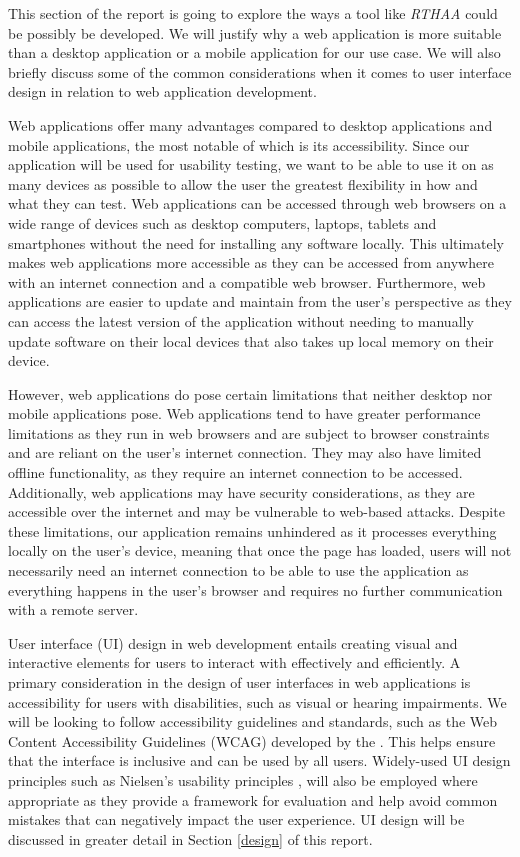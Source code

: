 \documentclass[12pt, a4paper]{article}
\newcommand{\np}
    {
    \vskip 0.4cm
    }
\begin{document}
This section of the report is going to explore the ways a tool like \textit{RTHAA} could be possibly be developed. We will justify why a web application is more suitable than a desktop application or a mobile application for our use case.  We will also briefly discuss some of the common considerations when it comes to user interface design in relation to web application development.
\np
Web applications offer many advantages compared to desktop applications and mobile applications, the most notable of which is its accessibility. Since our application will be used for usability testing, we want to be able to use it on as many devices as possible to allow the user the greatest flexibility in how and what they can test. Web applications can be accessed through web browsers on a wide range of devices such as desktop computers, laptops, tablets and smartphones without the need for installing any software locally. This ultimately makes web applications more accessible as they can be accessed from anywhere with an internet connection and a compatible web browser. Furthermore, web applications are easier to update and maintain from the user's perspective as they can access the latest version of the application without needing to manually update software on their local devices that also takes up local memory on their device.
\np
However, web applications do pose certain limitations that neither desktop nor mobile applications pose. Web applications tend to have greater performance limitations as they run in web browsers and are subject to browser constraints and are reliant on the user's internet connection. They may also have limited offline functionality, as they require an internet connection to be accessed. Additionally, web applications may have security considerations, as they are accessible over the internet and may be vulnerable to web-based attacks. Despite these limitations, our application remains unhindered as it processes everything locally on the user's device, meaning that once the page has loaded, users will not necessarily need an internet connection to be able to use the application as everything happens in the user's browser and requires no further communication with a remote server.
\np
User interface (UI) design in web development entails creating visual and interactive elements for users to interact with effectively and efficiently. A primary consideration in the design of user interfaces in web applications is accessibility for users with disabilities, such as visual or hearing impairments. We will be looking to follow accessibility guidelines and standards, such as the Web Content Accessibility Guidelines (WCAG) developed by the \cite{WCAG21}. This helps ensure that the interface is inclusive and can be used by all users. Widely-used UI design principles such as Nielsen's usability principles \citep{nielsen1994usability}, will also be employed where appropriate as they provide a framework for evaluation and help avoid common mistakes that can negatively impact the user experience. UI design will be discussed in greater detail in Section \ref{design} of this report.
\end{document}
